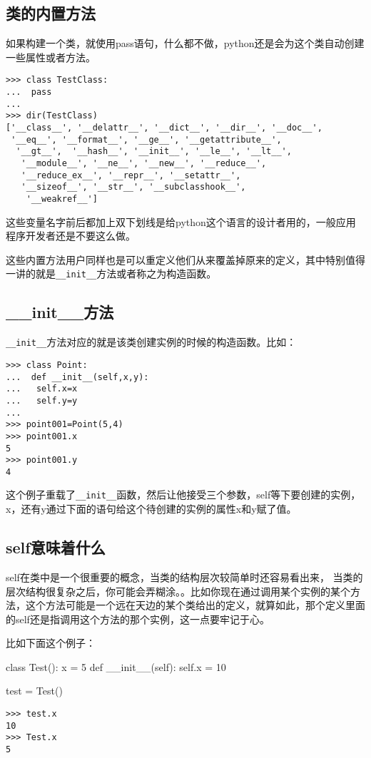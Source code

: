 \documentclass[12pt,oneside]{book}
\begin{document}
\begin{common-format}
\section{类的内置方法}
如果构建一个类，就使用pass语句，什么都不做，python还是会为这个类自动创建一些属性或者方法。
\begin{Verbatim}
>>> class TestClass:
...  pass
... 
>>> dir(TestClass)
['__class__', '__delattr__', '__dict__', '__dir__', '__doc__',
 '__eq__', '__format__', '__ge__', '__getattribute__',
  '__gt__',  '__hash__', '__init__', '__le__', '__lt__',
   '__module__', '__ne__', '__new__', '__reduce__', 
   '__reduce_ex__', '__repr__', '__setattr__', 
   '__sizeof__', '__str__', '__subclasshook__',
    '__weakref__']
\end{Verbatim}

这些变量名字前后都加上双下划线是给python这个语言的设计者用的，一般应用程序开发者还是不要这么做。

这些内置方法用户同样也是可以重定义他们从来覆盖掉原来的定义，其中特别值得一讲的就是\verb+__init__+方法或者称之为构造函数。

\subsection{\_\_init\_\_{}方法}
\verb+__init__+方法对应的就是该类创建实例的时候的构造函数。比如：
\begin{Verbatim}
>>> class Point:
...  def __init__(self,x,y):
...   self.x=x
...   self.y=y
... 
>>> point001=Point(5,4)
>>> point001.x
5
>>> point001.y
4
\end{Verbatim}
这个例子重载了\verb+__init__+函数，然后让他接受三个参数，self等下要创建的实例，x，还有y通过下面的语句给这个待创建的实例的属性x和y赋了值。


\subsection{self意味着什么}
self在类中是一个很重要的概念，当类的结构层次较简单时还容易看出来， 当类的层次结构很复杂之后，你可能会弄糊涂。。比如你现在通过调用某个实例的某个方法，这个方法可能是一个远在天边的某个类给出的定义，就算如此，那个定义里面的self还是指调用这个方法的那个实例，这一点要牢记于心。

比如下面这个例子：
\begin{tcbpython}[]
class Test():
    x = 5
    def __init__(self):
        self.x = 10

test = Test()
\end{tcbpython}
\begin{Verbatim}
>>> test.x
10
>>> Test.x
5
\end{Verbatim}


\end{common-format}
\end{document}
